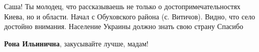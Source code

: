  
 
 
 
 


Саша! Ты молодец, что рассказываешь не только о достопримечательностях Киева, но
и области.  Начал с Обуховского района (с. Витичов).  Видно, что село достойно
внимания.  Население Украины должно знать свою страну Спасибо

\textbf{Рона Ильинична}, закусывайте лучше, мадам!
